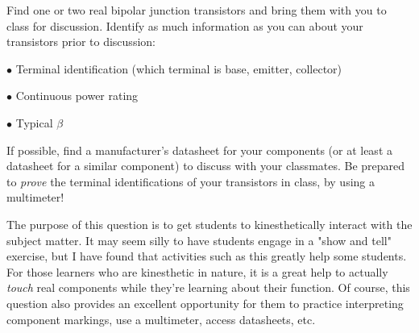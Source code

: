 

Find one or two real bipolar junction transistors and bring them with you to class for discussion.  Identify as much information as you can about your transistors prior to discussion:

\medskip
\item{$\bullet$} Terminal identification (which terminal is base, emitter, collector)
\item{$\bullet$} Continuous power rating
\item{$\bullet$} Typical $\beta$
\medskip







If possible, find a manufacturer's datasheet for your components (or at least a datasheet for a similar component) to discuss with your classmates.  Be prepared to {\it prove} the terminal identifications of your transistors in class, by using a multimeter!







The purpose of this question is to get students to kinesthetically interact with the subject matter.  It may seem silly to have students engage in a "show and tell" exercise, but I have found that activities such as this greatly help some students.  For those learners who are kinesthetic in nature, it is a great help to actually {\it touch} real components while they're learning about their function.  Of course, this question also provides an excellent opportunity for them to practice interpreting component markings, use a multimeter, access datasheets, etc.




